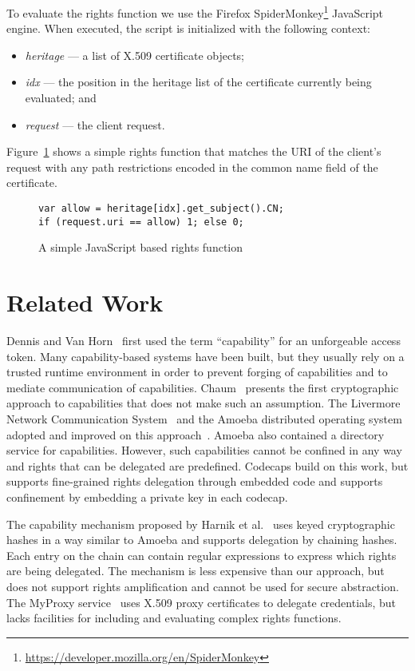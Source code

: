 \documentclass[10pt, conference, compsocconf]{IEEEtran}
\begin{document}
To evaluate the rights function we use the Firefox
SpiderMonkey\footnote{\url{https://developer.mozilla.org/en/SpiderMonkey}}
JavaScript engine. 
When executed, the script is initialized with the following context:
\begin{itemize}
\item \emph{heritage} --- a list of X.509 certificate objects;
\item \emph{idx} --- the position in the heritage list of the certificate currently being evaluated; and
\item \emph{request} --- the client request.
\end{itemize}
Figure~\ref{fig:javascript1} shows a simple rights function that matches the URI of the client's request with
any path restrictions encoded in the common name field of the certificate. 


\begin{figure}
\small
\begin{verbatim}
var allow = heritage[idx].get_subject().CN;
if (request.uri == allow) 1; else 0;
\end{verbatim}
  \caption{A simple JavaScript based rights function}
  \label{fig:javascript1}
\end{figure}


\section{Related Work}

Dennis and Van Horn~\cite{DvH66} first used the term ``capability''
for an unforgeable access token.  Many capability-based systems
have been built, but they usually rely on a trusted runtime environment
in order to prevent forging of capabilities and to mediate communication
of capabilities.  Chaum~\cite{CF78} presents the first cryptographic
approach to capabilities that does not make such an assumption.
The Livermore Network Communication System~\cite{Don81} and the
Amoeba distributed operating system~\cite{MT86} adopted and
improved on this approach~\cite{TMvR86}.  Amoeba also contained a
directory service for capabilities.  However, such capabilities
cannot be confined in any way and rights that can be delegated are
predefined.  Codecaps build on this work, but supports fine-grained
rights delegation through embedded code and supports confinement by
embedding a private key in each codecap.

The capability mechanism proposed by Harnik et al.~\cite{Harnik2011}
uses keyed cryptographic hashes in a way similar to Amoeba and
supports delegation by chaining hashes.  Each entry on the chain
can contain regular expressions to express which rights are being
delegated.  The mechanism is less expensive than our approach,
but does not support rights amplification and cannot be used for
secure abstraction.  The MyProxy service~\cite{Basney2005:MyProxy}
uses X.509 proxy certificates to delegate credentials, but
lacks facilities for including and evaluating complex rights
functions.
\end{document}
